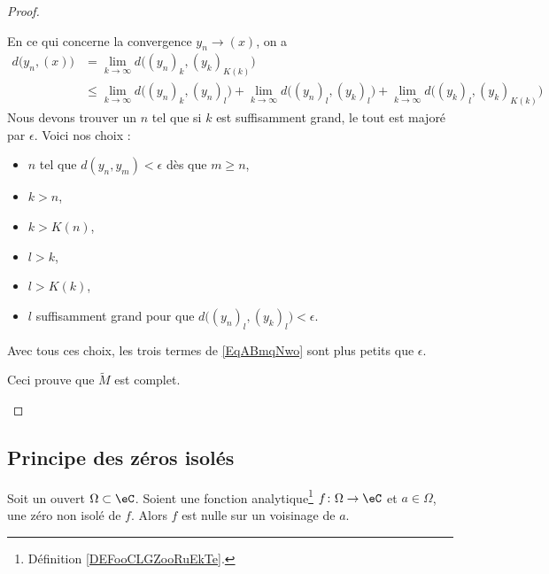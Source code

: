 \begin{proof}
\begin{subproof}
		En ce qui concerne la convergence \( y_n\to (x)\), on a
		\begin{subequations}
			\begin{align}
				d\big( y_n,(x) \big) & =\lim_{k\to \infty} d\big( (y_n)_k,(y_k)_{K(k)} \big)                                                                                                                            \\
				                     & \leq \lim_{k\to \infty} d\big( (y_n)_k,(y_n)_l \big)+\lim_{k\to \infty} d\big( (y_n)_l,(y_k)_{l} \big)+\lim_{k\to \infty} d\big( (y_k)_l,(y_k)_{K(k)} \big)    \label{EqABmqNwo}
			\end{align}
		\end{subequations}
		Nous devons trouver un \( n\) tel que si \( k\) est suffisamment grand, le tout est majoré par \( \epsilon\). Voici nos choix :
		\begin{itemize}
			\item \( n\) tel que \( d(y_n,y_m)<\epsilon\) dès que \( m\geq n\),
			\item \( k>n\),
			\item \( k>K(n)\),
			\item \( l>k\),
			\item \( l>K(k)\),
			\item \( l\) suffisamment grand pour que \( d\big( (y_n)_l,(y_k)_l \big)<\epsilon\).
		\end{itemize}
		Avec tous ces choix, les trois termes de \eqref{EqABmqNwo} sont plus petits que \( \epsilon\).

		Ceci prouve que \( \tilde M\) est complet.
	\end{subproof}
\end{proof}

\subsection{Principe des zéros isolés}

\begin{theorem}     \label{ThoukDPBX}
	Soit un ouvert \( \Omega\subset \eC\). Soient une fonction analytique\footnote{Définition \ref{DEFooCLGZooRuEkTe}.} \(f\colon \Omega\to \eC \) et \( a\in \Omega\), une zéro non isolé de \( f\). Alors \( f\) est nulle sur un voisinage de \( a\).
\end{theorem}

